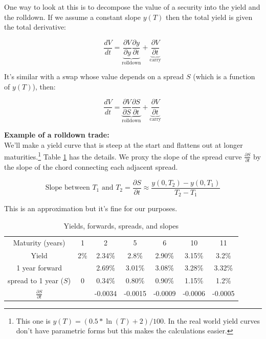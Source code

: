 One way to look at this is to decompose the value of a security into the yield and the rolldown. If we assume a constant slope $y(T)$ then the total yield is given the total derivative:

\[\frac{d V}{d t} = \underbrace{\frac{\partial V}{\partial y}\frac{\partial y}{\partial t}}_{\mbox{rolldown}} + \underbrace{\frac{\partial V}{\partial t}}_{\mbox{carry}}\ \]

It's similar with a swap whose value depends on a spread $S$ (which is a function of $y(T)$), then:

\[\frac{d V}{d t} = \underbrace{\frac{\partial V}{\partial S}\frac{\partial S}{\partial t}}_{\mbox{rolldown}} + \underbrace{\frac{\partial V}{\partial t}}_{\mbox{carry}}\ \]


\textbf{Example of a rolldown trade:}\\

We'll make a yield curve that is steep at the start and flattens out at longer maturities.\footnote{This one is $y(T) = (0.5*\ln(T)+2)/100$. In the real world yield curves don't have parametric forms but this makes the calculations easier.}  Table \ref{tab:rolldownTable} has the details. We proxy the slope of the spread curve $\frac{\partial S}{\partial t}$ by the slope of the chord connecting each adjacent spread. 

\[\mbox{Slope between $T_1$ and $T_2$} = \frac{\partial S}{\partial t} \approx \frac{y(0,T_2)-y(0,T_1)}{T_2-T_1} \]

This is an approximation but it's fine for our purposes.

\begin{center}
\begin{table}
\begin{tabular}{|c|cccccc|}
\hline
Maturity (years) & 1 & 2 & 5 & 6 & 10 & 11\\
Yield & 2\% & 2.34\% & 2.8\% & 2.90\%  & 3.15\% & 3.2\%\\  
1 year forward & & 2.69\% & 3.01\% & 3.08\% & 3.28\% & 3.32\% \\
spread to 1 year ($S$) & 0 & 0.34\% & 0.80\% & 0.90\% & 1.15\% & 1.2\%\\ 
$\frac{\partial S}{\partial t}$ & & -0.0034 & -0.0015 & -0.0009 & -0.0006 & -0.0005\\
\hline
\end{tabular}
\caption{Yields, forwards, spreads, and slopes}
\label{tab:rolldownTable}
\end{table}
\end{center}


